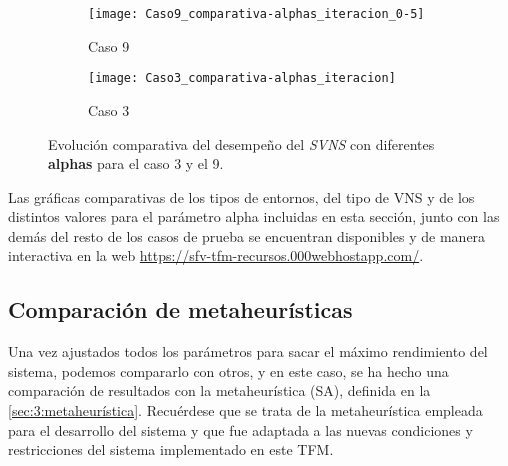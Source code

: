 \begin{figure}
	\begin{subfigure}{\linewidth}
	\texttt{[image: Caso9\_comparativa-alphas\_iteracion\_0-5]}
	\caption{Caso 9}
	\label{fig:caso9comparativa-alphasiteracion0-5}
	\centering
	\end{subfigure}

	\begin{subfigure}{\linewidth}
	\texttt{[image: Caso3\_comparativa-alphas\_iteracion]}
	\caption{Caso 3}
	\label{fig:Caso3_comparativa-alphas_iteracion}
	\centering
\end{subfigure}
	\caption{Evolución comparativa del desempeño del \textit{SVNS} con diferentes \textbf{alphas} para el caso 3 y el 9.}
\end{figure}

Las gráficas comparativas de los tipos de entornos, del tipo de VNS y de los distintos valores para el parámetro alpha incluidas en esta sección, junto con las demás del resto de los casos de prueba se encuentran disponibles y de manera interactiva en la web \url{https://sfv-tfm-recursos.000webhostapp.com/}.


%
%

\subsection{Comparación de metaheurísticas}

Una vez ajustados todos los parámetros para sacar el máximo rendimiento del sistema, podemos compararlo con otros, y en este caso, se ha hecho una comparación de resultados con la metaheurística \sa{} (SA), definida en la \autoref{sec:3:metaheurística}. Recuérdese que se trata de la metaheurística empleada para el desarrollo del sistema \legacy{} y que fue adaptada a las nuevas condiciones y restricciones del sistema implementado en este TFM.

